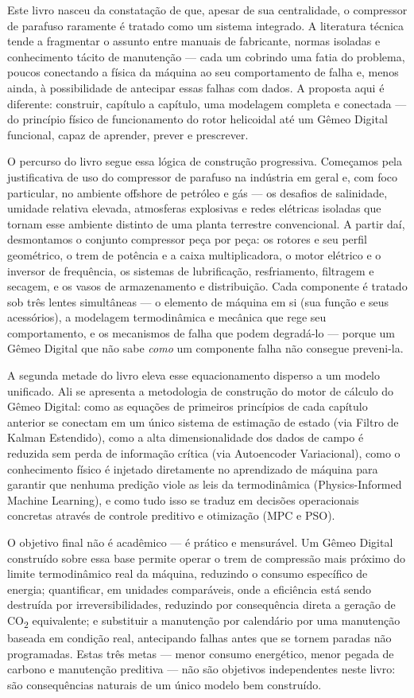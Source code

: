 \documentclass[12pt,a4paper]{article}
\numberwithin{equation}{section}
\numberwithin{table}{section}
\numberwithin{figure}{section}
\begin{document}
Este livro nasceu da constatação de que, apesar de sua centralidade, o compressor de parafuso raramente é tratado como um sistema integrado. A literatura técnica tende a fragmentar o assunto entre manuais de fabricante, normas isoladas e conhecimento tácito de manutenção — cada um cobrindo uma fatia do problema, poucos conectando a física da máquina ao seu comportamento de falha e, menos ainda, à possibilidade de antecipar essas falhas com dados. A proposta aqui é diferente: construir, capítulo a capítulo, uma modelagem completa e conectada — do princípio físico de funcionamento do rotor helicoidal até um Gêmeo Digital funcional, capaz de aprender, prever e prescrever.

O percurso do livro segue essa lógica de construção progressiva. Começamos pela justificativa de uso do compressor de parafuso na indústria em geral e, com foco particular, no ambiente offshore de petróleo e gás — os desafios de salinidade, umidade relativa elevada, atmosferas explosivas e redes elétricas isoladas que tornam esse ambiente distinto de uma planta terrestre convencional. A partir daí, desmontamos o conjunto compressor peça por peça: os rotores e seu perfil geométrico, o trem de potência e a caixa multiplicadora, o motor elétrico e o inversor de frequência, os sistemas de lubrificação, resfriamento, filtragem e secagem, e os vasos de armazenamento e distribuição. Cada componente é tratado sob três lentes simultâneas — o elemento de máquina em si (sua função e seus acessórios), a modelagem termodinâmica e mecânica que rege seu comportamento, e os mecanismos de falha que podem degradá-lo — porque um Gêmeo Digital que não sabe \textit{como} um componente falha não consegue preveni-la.

A segunda metade do livro eleva esse equacionamento disperso a um modelo unificado. Ali se apresenta a metodologia de construção do motor de cálculo do Gêmeo Digital: como as equações de primeiros princípios de cada capítulo anterior se conectam em um único sistema de estimação de estado (via Filtro de Kalman Estendido), como a alta dimensionalidade dos dados de campo é reduzida sem perda de informação crítica (via Autoencoder Variacional), como o conhecimento físico é injetado diretamente no aprendizado de máquina para garantir que nenhuma predição viole as leis da termodinâmica (Physics-Informed Machine Learning), e como tudo isso se traduz em decisões operacionais concretas através de controle preditivo e otimização (MPC e PSO).

O objetivo final não é acadêmico — é prático e mensurável. Um Gêmeo Digital construído sobre essa base permite operar o trem de compressão mais próximo do limite termodinâmico real da máquina, reduzindo o consumo específico de energia; quantificar, em unidades comparáveis, onde a eficiência está sendo destruída por irreversibilidades, reduzindo por consequência direta a geração de CO\textsubscript{2} equivalente; e substituir a manutenção por calendário por uma manutenção baseada em condição real, antecipando falhas antes que se tornem paradas não programadas. Estas três metas — menor consumo energético, menor pegada de carbono e manutenção preditiva — não são objetivos independentes neste livro: são consequências naturais de um único modelo bem construído.
\end{document}
